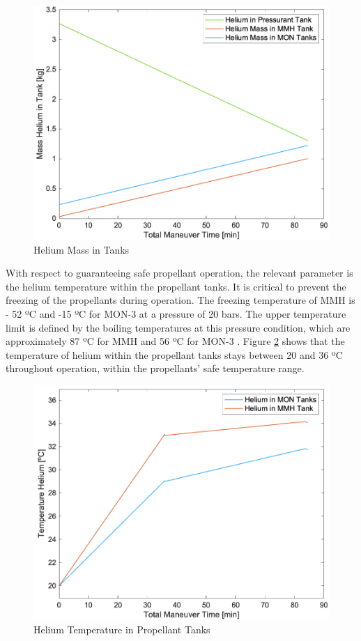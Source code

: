 \documentclass[conference]{IEEEtran}
\begin{document}
\begin{figure}[H]
  \centering
  \includegraphics[width=0.8\linewidth]{img/HeliumMass.png}
  \caption{Helium Mass in Tanks}
  \label{fig:HeMass}
\end{figure}
With respect to guaranteeing safe propellant operation, the relevant parameter is the helium temperature within the propellant tanks. It is critical to prevent the freezing of the propellants during operation. The freezing temperature of MMH is - 52 ºC \cite{MONMMH42:online} and -15 ºC for MON-3 \cite{Basicsof18:online} at a pressure of 20 bars. The upper temperature limit is defined by the boiling temperatures at this pressure condition, which are approximately 87 ºC for MMH and 56 ºC for MON-3 \cite{2019003356:online}. Figure \ref{fig:HeTempProp} shows that the temperature of helium within the propellant tanks stays between 20 and 36 ºC throughout operation, within the propellants' safe temperature range.
\begin{figure}[H]
  \centering
  \includegraphics[width=0.8\linewidth]{img/HeliumTempPropellantTanks.png}
  \caption{Helium Temperature in Propellant Tanks}
  \label{fig:HeTempProp}
\end{figure}
\end{document}
